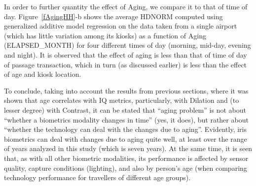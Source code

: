 \documentclass{cta-author}%
\newcommand{\cmt}[1]{}
\begin{document}




In order to further quantity the \cmt {negligible} effect of Aging, we compare it to that of 
time of day. Figure~\ref{fAgingHH}-b shows the average HDNORM computed using generalized additive model regression on the data taken from a single airport (which has little variation among its kiosks) as a function of Aging (ELAPSED\_MONTH) for four different times of day (morning, mid-day, evening and night).
It is observed that the effect of aging is less  than that of time of day of passage transaction, which in turn (as discussed earlier) is less than the effect of age and kiosk location.

To conclude, 
taking into account the results from previous sections, where it was shown that age correlates with IQ metrics, particularly, with Dilation  and (to lesser degree) with Contrast, it can be stated 
that ``aging problem'' is not about ``whether a biometrics modality changes in time'' (yes, it does), but rather about ``whether the technology can deal with the changes due to aging''. 
Evidently, iris biometrics can deal with changes due to aging quite well, at least 
over the range of years analyzed in this  study (which is seven years). 
At the same time, 
it is seen that, as with all other biometric modalities, its performance is affected by sensor quality, capture conditions (lighting), and also by person's age (when comparing technology performance for  travellers of  different age groups).

\end{document}
